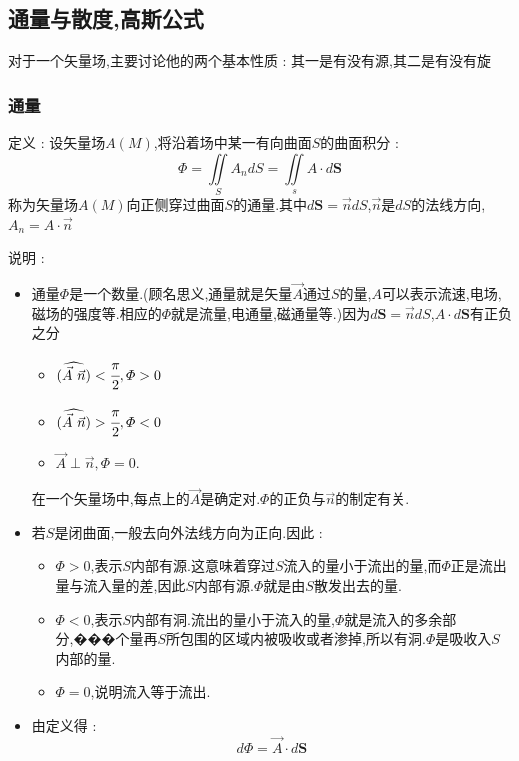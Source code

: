\documentclass[UTF8,12pt]{ctexbook}
\newcommand{\doubleIntegralOnZone}[1]{\iint\limits_{#1}}
\newcommand{\vecAngle}[2]{(\widehat{#1\ #2})}
\begin{document}
{{{{  }%

  \subsection{通量与散度,高斯公式}{
    对于一个矢量场,主要讨论他的两个基本性质 : 其一是有没有源,其二是有没有旋

    \subsubsection{通量}{
      定义 : 设矢量场$A(M)$,将沿着场中某一有向曲面$S$的曲面积分 :
      $$
        \varPhi = \doubleIntegralOnZone{S} A_n dS = \doubleIntegralOnZone{s} A \cdot d\mathbf{S}
      $$
      称为矢量场$A(M)$向正侧穿过曲面$S$的通量.其中$d\mathbf{S} = \vec{n}dS$,$\vec{n}$是$dS$的法线方向,$A_n = A \cdot \vec{n}$

      说明 :
      \begin{itemize}
        \item {通量$\varPhi$是一个数量.(顾名思义,通量就是矢量$\vec{A}$通过$S$的量,$A$可以表示流速,电场,磁场的强度等.相应的$\varPhi$就是流量,电通量,磁通量等.)因为$d\mathbf{S} = \vec{n}dS$,$A\cdot d\mathbf{S}$有正负之分

              \begin{itemize}
                \item $\vecAngle{\vec{A}}{\vec{n}} < \cfrac{\pi}{2},\varPhi > 0$
                \item $\vecAngle{\vec{A}}{\vec{n}} > \cfrac{\pi}{2},\varPhi < 0$
                \item $\vec{A} \perp \vec{n},\varPhi = 0$.
              \end{itemize}

              在一个矢量场中,每点上的$\vec{A}$是确定对.$\varPhi$的正负与$\vec{n}$的制定有关.
              }
        \item {
              若$S$是闭曲面,一般去向外法线方向为正向.因此 :

              \begin{itemize}
                \item $\varPhi > 0$,表示$S$内部有源.这意味着穿过$S$流入的量小于流出的量,而$\varPhi$正是流出量与流入量的差,因此$S$内部有源.$\varPhi$就是由$S$散发出去的量.
                \item $\varPhi < 0$,表示$S$内部有洞.流出的量小于流入的量,$\varPhi$就是流入的多余部分,���个量再$S$所包围的区域内被吸收或者渗掉,所以有洞.$\varPhi$是吸收入$S$内部的量.
                \item $\varPhi = 0$,说明流入等于流出.
              \end{itemize}
              }
        \item {
              由定义得 :
              $$
                d\varPhi = \vec{A} \cdot d\mathbf{S}
              $$

}
\end{itemize}}}}}}
\end{document}
